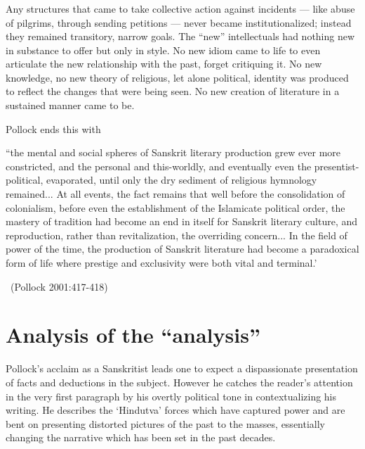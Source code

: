 \subsubsection{} Any structures that came to take collective action against incidents --- like abuse of pilgrims, through sending petitions --- never became institutionalized; instead they remained transitory, narrow goals. The “new” intellectuals had nothing new in substance to offer but only in style. No new idiom came to life to even articulate the new relationship with the past, forget critiquing it. No new knowledge, no new theory of religious, let alone political, identity was produced to reflect the changes that were being seen. No new creation of literature in a sustained manner came to be. 

Pollock ends this with 

\begin{myquote}
\eleven
“the mental and social spheres of Sanskrit literary production grew ever more constricted, and the personal and this-worldly, and eventually even the presentist-political, evaporated, until only the dry sediment of religious hymnology remained... At all events, the fact remains that well before the consolidation of colonialism, before even the establishment of the Islamicate political order, the mastery of tradition had become an end in itself for Sanskrit literary culture, and reproduction, rather than revitalization, the overriding concern... In the field of power of the time, the production of Sanskrit literature had become a paradoxical form of life where prestige and exclusivity were both vital and terminal.’
\vskip -5pt

~\hfill(Pollock 2001:417-418)
\end{myquote}
\vskip -40pt

\section{Analysis of the “analysis”}
\vskip -5pt

Pollock’s acclaim as a Sanskritist leads one to expect a dispassionate presentation of facts and deductions in the subject. However he catches the reader’s attention in the very first paragraph by his overtly political tone in contextualizing his writing. He describes the ‘Hindutva’ forces which have captured power and are bent on presenting distorted pictures of the past to the masses, essentially changing the narrative which has been set in the past decades. 

